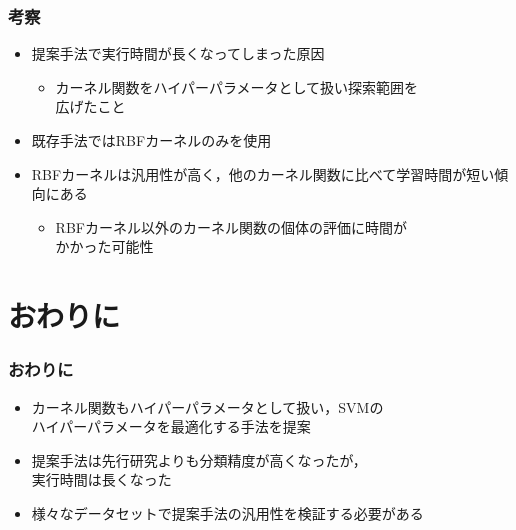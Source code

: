 \documentclass[11pt,dvipdfmx,cjk]{beamer}
\begin{document}
\begin{frame}
  \frametitle{考察}
  \begin{itemize}
    \item 提案手法で実行時間が長くなってしまった原因
    \begin{itemize}
      \item  カーネル関数をハイパーパラメータとして扱い探索範囲を\\広げたこと
    \end{itemize}
    \item 既存手法ではRBFカーネルのみを使用
    \item RBFカーネルは汎用性が高く，他のカーネル関数に比べて学習時間が短い傾向にある
    \begin{itemize}
      \item RBFカーネル以外のカーネル関数の個体の評価に時間が\\かかった可能性
    \end{itemize}
  \end{itemize}
\end{frame}
\section{おわりに}
\begin{frame}
  \frametitle{おわりに}
  \begin{itemize}
    \item カーネル関数もハイパーパラメータとして扱い，SVMの\\ハイパーパラメータを最適化する手法を提案
  \item 提案手法は先行研究よりも分類精度が高くなったが，\\実行時間は長くなった

  \item 様々なデータセットで提案手法の汎用性を検証する必要がある
  \end{itemize}
\end{frame}
  
\end{document}
